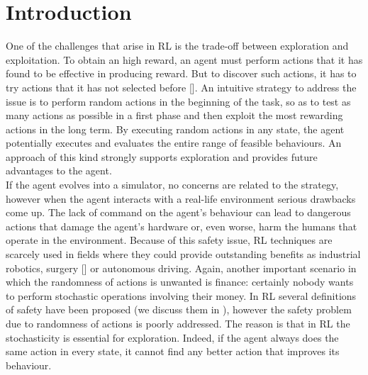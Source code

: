\chapter{Introduction} \label{ch:intro}

One of the challenges that arise in \acf{RL} is the trade-off between exploration and exploitation. To obtain an high reward, an agent must perform actions that it has found to be effective in producing reward. But to discover such actions, it has to try actions that it has not selected before [\cite{sutton2018reinforcement}]. An intuitive strategy to address the issue is to perform random actions in the beginning of the task, so as to test as many actions as possible in a first phase and then exploit the most rewarding actions in the long term. By executing random actions in any state, the agent potentially executes and evaluates the entire range of feasible behaviours. An approach of this kind strongly supports exploration and provides future advantages to the agent.\\
\newline
If the agent evolves into a simulator, no concerns are related to the strategy, however when the agent interacts with a real-life environment serious drawbacks come up. The lack of command on the agent's behaviour can lead to dangerous actions that damage the agent's hardware or, even worse, harm the humans that operate in the environment. Because of this safety issue, \ac{RL} techniques are scarcely used in fields where they could provide outstanding benefits as industrial robotics, surgery [\cite{baek2018PathPlanning}] or autonomous driving. Again, another important scenario in which the randomness of actions is unwanted is finance: certainly nobody wants to perform stochastic operations involving their money. In \ac{RL} several definitions of safety have been proposed (we discuss them in ), however the safety problem due to randomness of actions is poorly addressed. The reason is that in \ac{RL} the stochasticity is essential for exploration. Indeed, if the agent always does the same action in every state, it cannot find any better action that improves its behaviour.\\
\newline

